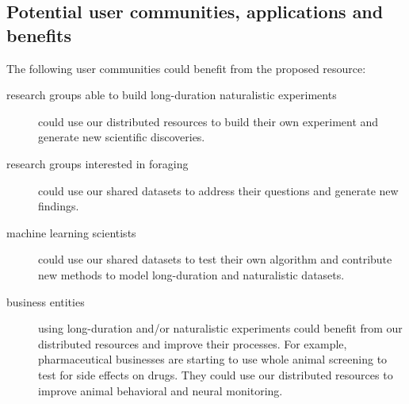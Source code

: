 \subsection{Potential user communities, applications and benefits}

%

The following user communities could benefit from the proposed resource:

\begin{description}

    \item[research groups able to build long-duration naturalistic experiments]
        could use our distributed resources to build their own experiment and
        generate new scientific discoveries.

    \item[research groups interested in foraging] could use our shared datasets
        to address their questions and generate new findings.

    \item[machine learning scientists] could use our shared datasets to test
        their own algorithm and contribute new methods to model long-duration
        and naturalistic datasets.

    \item[business entities] using long-duration and/or naturalistic
        experiments could benefit from our distributed resources and improve
        their processes. For example, pharmaceutical businesses are starting to
        use whole animal screening to test for side effects on drugs. They
        could use our distributed resources to improve animal behavioral and
        neural monitoring.

\end{description}

